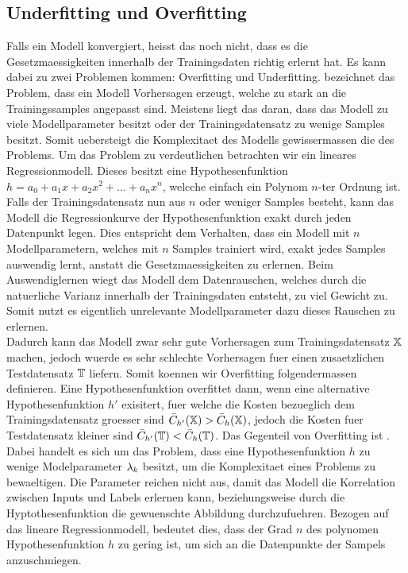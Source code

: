\subsection{Underfitting und Overfitting}
Falls ein Modell konvergiert, heisst das noch nicht, dass es die
Gesetzmaessigkeiten innerhalb der Trainingsdaten richtig erlernt hat.
Es kann dabei zu zwei Problemen kommen: Overfitting und Underfitting.
\para{}
 bezeichnet das Problem, dass ein Modell Vorhersagen
erzeugt, welche zu stark an die Trainingssamples angepasst sind.
Meistens liegt das daran, dass das Modell zu viele Modellparameter besitzt oder
der Trainingsdatensatz zu wenige Samples besitzt.
Somit uebersteigt die Komplexitaet des Modells gewissermassen die des Problems.
\para{}
Um das Problem zu verdeutlichen betrachten wir ein lineares Regressionmodell.
Dieses besitzt eine Hypothesenfunktion $h = a_0 + a_1 x + a_2 x^2 + \ldots + a_n
x^n$, welcche einfach ein Polynom $n$-ter Ordnung ist. Falls der
Trainingsdatensatz nun aus $n$ oder weniger Samples besteht, kann das Modell die
Regressionkurve der Hypothesenfunktion exakt durch jeden Datenpunkt legen.
Dies entspricht dem Verhalten, dass ein Modell mit $n$ Modellparametern, welches
mit $n$ Samples trainiert wird, exakt jedes Samples auswendig lernt, anstatt die
Gesetzmaessigkeiten zu erlernen.
Beim Auswendiglernen
wiegt das Modell dem Datenrauschen, welches durch die natuerliche Varianz
innerhalb der Trainingsdaten entsteht, zu viel Gewicht zu. Somit nutzt es
eigentlich unrelevante Modellparameter dazu dieses Rauschen zu erlernen. \\
Dadurch kann das Modell zwar sehr gute Vorhersagen zum Trainingsdatensatz
$\mathbb{X}$ machen, jedoch wuerde es sehr schlechte Vorhersagen fuer einen
zusaetzlichen Testdatensatz $\mathbb{T}$ liefern.
\para{}
Somit koennen wir Overfitting folgendermassen definieren. Eine
Hypothesenfunktion overfittet dann, wenn eine alternative Hypothesenfunktion
$h'$ exisitert, fuer welche die Kosten bezueglich dem Trainingsdatensatz
groesser sind $\bar{C}_{h'}(\mathbb{X}) > \bar{C}_h(\mathbb{X})$, jedoch die Kosten
fuer Testdatensatz kleiner sind $\bar{C}_{h'}(\mathbb{T}) < \bar{C}_h(\mathbb{T})$.
\para{}
Das Gegenteil von Overfitting ist . Dabei handelt es sich um das Problem, dass eine
Hypothesenfunktion $h$ zu
wenige Modelparameter $\lambda_k$ besitzt, um die Komplexitaet eines Problems zu bewaeltigen.
Die Parameter reichen nicht aus, damit das Modell die Korrelation zwischen
Inputs und Labels erlernen kann, beziehungsweise durch die Hyptothesenfunktion
die gewuenschte Abbildung durchzufuehren.
\para{}
Bezogen auf das lineare Regressionmodell, bedeutet dies, dass der Grad $n$ des
polynomen Hypothesenfunktion $h$ zu gering ist, um sich an die Datenpunkte der
Sampels anzuschmiegen.

